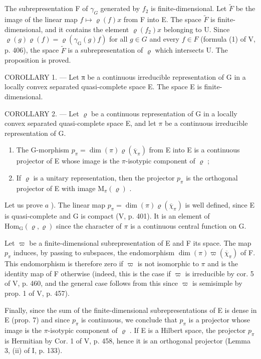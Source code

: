 The subrepresentation F of \(\gamma_{G}\) generated by \(f_{2}\) is finite-dimensional. Let \(\widetilde{F}\) be the image of the linear map \(f \mapsto \varrho(f)x\) from F into E. The space \(\widetilde{F}\) is finite-dimensional, and it contains the element \(\varrho(f_{2})x\) belonging to U. Since \(\varrho(g)\varrho(f) = \varrho(\gamma_{\mathrm{G}}(g)f)\) for all \(g \in G\) and every \(f \in F\) (formula (1) of V, p. 406), the space \(\widetilde{F}\) is a subrepresentation of \(\varrho\) which intersects U. The proposition is proved.

COROLLARY 1. --- Let π be a continuous irreducible representation of G in a locally convex separated quasi-complete space E. The space E is finite-dimensional.

COROLLARY 2. --- Let \(\varrho\) be a continuous representation of G in a locally convex separated quasi-complete space E, and let \(\pi\) be a continuous irreducible representation of G.

\begin{enumerate}
\def\labelenumi{\alph{enumi})}
\item
  The G-morphism \(p_{\pi} = \dim(\pi)\varrho(\overline{\chi}_{\pi})\) from E into E is a continuous projector of E whose image is the \(\pi\)-isotypic component of \(\varrho\) ;
\item
  If \(\varrho\) is a unitary representation, then the projector \(p_{\pi}\) is the orthogonal projector of E with image \(\mathrm{M}_{\pi}(\varrho)\) .
\end{enumerate}

Let us prove \(a\) ). The linear map \(p_{\pi} = \dim(\pi)\varrho(\overline{\chi}_{\pi})\) is well defined, since E is quasi-complete and G is compact (V, p. 401). It is an element of \(\mathrm{Hom}_{\mathrm{G}}(\varrho,\varrho)\) since the character of \(\pi\) is a continuous central function on G.

Let \(\varpi\) be a finite-dimensional subrepresentation of E and F its space. The map \(p_{\pi}\) induces, by passing to subspaces, the endomorphism \(\dim(\pi)\varpi(\overline{\chi}_{\pi})\) of F. This endomorphism is therefore zero if \(\varpi\) is not isomorphic to \(\pi\) and is the identity map of F otherwise (indeed, this is the case if \(\varpi\) is irreducible by cor. 5 of V, p. 460, and the general case follows from this since \(\varpi\) is semisimple by prop. 1 of V, p. 457).

Finally, since the sum of the finite-dimensional subrepresentations of E is dense in E (prop. 7) and since \(p_{\pi}\) is continuous, we conclude that \(p_{\pi}\) is a projector whose image is the \(\pi\)-isotypic component of \(\varrho\) . If E is a Hilbert space, the projector \(p_{\pi}\) is Hermitian by Cor. 1 of V, p. 458, hence it is an orthogonal projector (Lemma 3, (ii) of I, p. 133).

